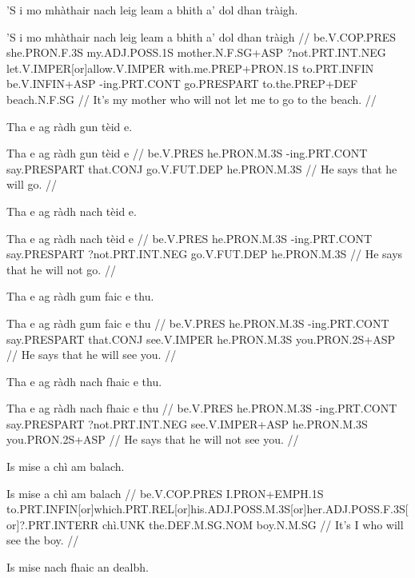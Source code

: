 \documentclass[a4paper,10pt]{article}
\begin{document}
\ex
\begingl
\glpre 'S i mo mhàthair nach leig leam a bhith a' dol dhan tràigh. 

\vspace{4mm}
\gla 'S i mo mhàthair nach leig leam a bhith a' dol dhan tràigh  //
\glb be.V.COP.PRES she.PRON.F.3S my.ADJ.POSS.1S mother.N.F.SG+ASP ?not.PRT.INT.NEG let.V.IMPER[or]allow.V.IMPER with.me.PREP+PRON.1S to.PRT.INFIN be.V.INFIN+ASP -ing.PRT.CONT go.PRESPART to.the.PREP+DEF beach.N.F.SG  //
\glft It's my mother who will not let me to go to the beach. //
\endgl
\xe

\ex
\begingl
\glpre Tha e ag ràdh gun tèid e. 

\vspace{4mm}
\gla Tha e ag ràdh gun tèid e  //
\glb be.V.PRES he.PRON.M.3S -ing.PRT.CONT say.PRESPART that.CONJ go.V.FUT.DEP he.PRON.M.3S  //
\glft He says that he will go. //
\endgl
\xe

\ex
\begingl
\glpre Tha e ag ràdh nach tèid e. 

\vspace{4mm}
\gla Tha e ag ràdh nach tèid e  //
\glb be.V.PRES he.PRON.M.3S -ing.PRT.CONT say.PRESPART ?not.PRT.INT.NEG go.V.FUT.DEP he.PRON.M.3S  //
\glft He says that he will not go. //
\endgl
\xe

\ex
\begingl
\glpre Tha e ag ràdh gum faic e thu. 

\vspace{4mm}
\gla Tha e ag ràdh gum faic e thu  //
\glb be.V.PRES he.PRON.M.3S -ing.PRT.CONT say.PRESPART that.CONJ see.V.IMPER he.PRON.M.3S you.PRON.2S+ASP  //
\glft He says that he will see you. //
\endgl
\xe

\ex
\begingl
\glpre Tha e ag ràdh nach fhaic e thu. 

\vspace{4mm}
\gla Tha e ag ràdh nach fhaic e thu  //
\glb be.V.PRES he.PRON.M.3S -ing.PRT.CONT say.PRESPART ?not.PRT.INT.NEG see.V.IMPER+ASP he.PRON.M.3S you.PRON.2S+ASP  //
\glft He says that he will not see you. //
\endgl
\xe

\ex
\begingl
\glpre Is mise a chì am balach. 

\vspace{4mm}
\gla Is mise a chì am balach  //
\glb be.V.COP.PRES I.PRON+EMPH.1S to.PRT.INFIN[or]which.PRT.REL[or]his.ADJ.POSS.M.3S[or]her.ADJ.POSS.F.3S[or]?.PRT.INTERR chì.UNK the.DEF.M.SG.NOM boy.N.M.SG  //
\glft It's I who will see the boy. //
\endgl
\xe

\ex
\begingl
\glpre Is mise nach fhaic an dealbh. 
\end{document}
